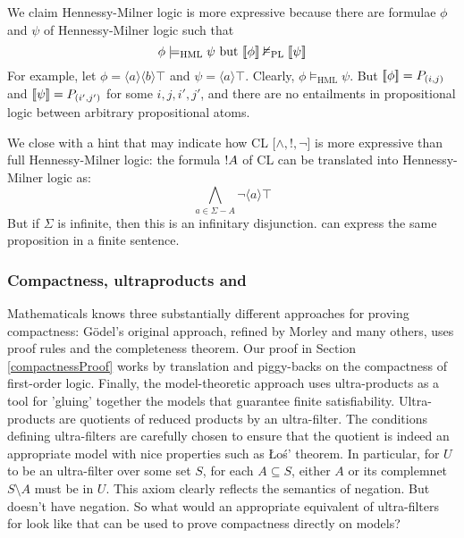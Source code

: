 \NI We claim Hennessy-Milner logic is more expressive because there
are formulae $\phi$ and $\psi$ of Hennessy-Milner logic such that
\[
\phi \models_{\text{{HML}}} \psi \mbox{ but } \lbrack\!\lbrack \phi \rbrack\!\rbrack \nvDash_{\text{PL}} \lbrack\!\lbrack \psi \rbrack\!\rbrack
\]
For example, let $\phi = \langle a \rangle \langle b \rangle \top$ and
$\psi = \langle a \rangle \top$.  Clearly, $\phi \models_{\text{HML}}
\psi$. But $\lbrack\!\lbrack \phi \rbrack\!\rbrack = P_{(i,j)}$ and $\lbrack\!\lbrack \psi \rbrack\!\rbrack = P_{(i',j')}$
for some $i,j,i',j'$, and there are no entailments in propositional
logic between arbitrary propositional atoms.

We close with a hint that may indicate  how CL [$\land, !, \neg$] is
more expressive than full Hennessy-Milner logic: the formula $!
A$ of CL can be translated into Hennessy-Milner logic as:
\[
\bigwedge_{a \in \Sigma - A} \neg \langle a \rangle \top
\]
But if $\Sigma$ is infinite, then this is an infinitary disjunction.
\Cathoristic{} can express the same proposition in a finite sentence.

\subsubsection{Compactness, ultraproducts and \cathoristic{}}

Mathematicals knows three substantially different approaches for
proving compactness: G\"odel's original approach, refined by Morley
and many others, uses proof rules and the completeness theorem.  Our
proof in Section \ref{compactnessProof} works by translation and
piggy-backs on the compactness of first-order logic. Finally, the
model-theoretic approach uses ultra-products as a tool for 'gluing'
together the models that guarantee finite
satisfiability. Ultra-products are quotients of reduced products by an
ultra-filter. The conditions defining ultra-filters are carefully
chosen to ensure that the quotient is indeed an appropriate model with
nice properties such as \L{}o\'{s}' theorem. In particular, for $U$ to
be an ultra-filter over some set $S$, for each $A \subseteq S$, either
$A$ or its complemnet $S\setminus A$ must be in $U$. This axiom
clearly reflects the semantics of negation. But \cathoristic{} doesn't
have negation. So what would an appropriate equivalent of
ultra-filters for \cathoristic{} look like that can be used to prove
compactness directly on models?

